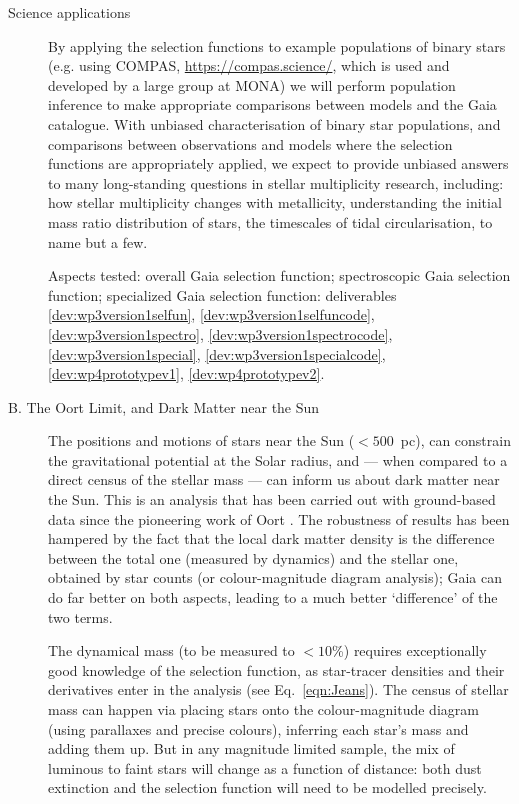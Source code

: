 \begin{workpackage}{Science applications}
\begin{wpobjectives}
\begin{description}
{        By applying the selection functions to example populations of binary stars (e.g. using COMPAS, \url{https://compas.science/}, which is used and developed by a large group at MONA) we will perform population inference to make appropriate comparisons between models and the Gaia catalogue. With unbiased characterisation of binary star populations, and comparisons between observations and models where the selection functions are appropriately applied, we expect to provide unbiased answers to many long-standing questions in stellar multiplicity research, including: 
        how stellar multiplicity changes with metallicity, understanding the initial mass ratio distribution of stars, the timescales of tidal circularisation, to name but a few.
        
        \textsf{Aspects tested: overall Gaia selection function; spectroscopic Gaia selection function; specialized Gaia selection function: deliverables \ref{dev:wp3version1selfun}, \ref{dev:wp3version1selfuncode}, \ref{dev:wp3version1spectro}, \ref{dev:wp3version1spectrocode}, \ref{dev:wp3version1special}, \ref{dev:wp3version1specialcode}, \ref{dev:wp4prototypev1}, \ref{dev:wp4prototypev2}.}
        }
      
      \item[B. The Oort Limit, and Dark Matter near the Sun]{
        The positions and motions of stars near the Sun ($<500$~pc), can constrain the gravitational potential at the Solar radius, and --- when compared to a direct census of the stellar mass --- can inform us about dark matter near the Sun. This is an analysis that has been carried out with ground-based data since the pioneering work of Oort \citep[e.g.][]{Read2014}. The robustness of results has been hampered by the fact that the local dark matter density is the difference between the total one (measured by dynamics) and the stellar one, obtained by star counts (or colour-magnitude diagram analysis); Gaia can do far better on both aspects, leading to a much better `difference' of the two terms. 
      
        The dynamical mass (to be measured to $<10$\%) requires exceptionally good knowledge of the selection function, as star-tracer densities and their derivatives enter in the analysis (see Eq.~\ref{eqn:Jeans}). The census of stellar mass can happen via placing stars onto the colour-magnitude diagram (using parallaxes and precise colours), inferring each star's mass and adding them up. But in any magnitude limited sample, the mix of luminous to faint stars will change as a function of distance: both dust extinction and the selection function will need to be modelled precisely. 
      
}
\end{description}
\end{wpobjectives}
\end{workpackage}
